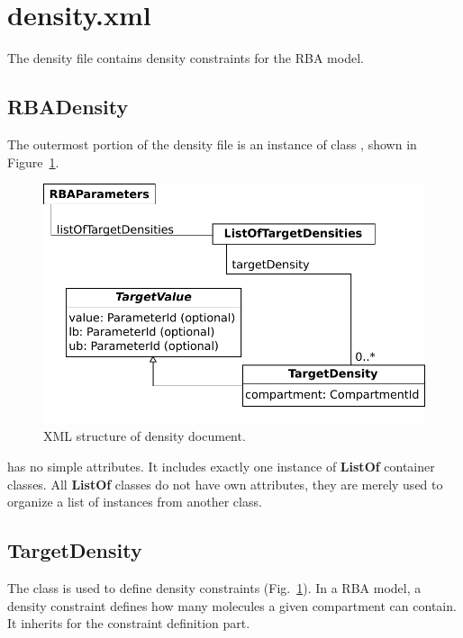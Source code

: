 
\section{density.xml}

The density file contains density constraints for the RBA model.


\subsection{RBADensity}
\label{sec:rba_density}

The outermost portion of the density file is an instance of class
\rbadensity, shown in Figure~\ref{fig:density_doc}.

\begin{figure}
  \centering
  \includegraphics[scale=0.8]{figures/density_doc}
  \caption{XML structure of density document.}
\label{fig:density_doc}
\end{figure}

\rbadensity{} has no simple attributes.
It includes exactly one instance of \textbf{ListOf} container classes.
All \textbf{ListOf} classes do not have own attributes,
they are merely used to organize a list of instances from another class.

\subsection{TargetDensity}
\label{sec:target_density}

The \targetdensity{} class is used to define density constraints
(Fig.~\ref{fig:density_doc}).
In a RBA model, a density constraint defines how many molecules
a given compartment can contain.
It inherits \targetvalue{} for the constraint definition part.

